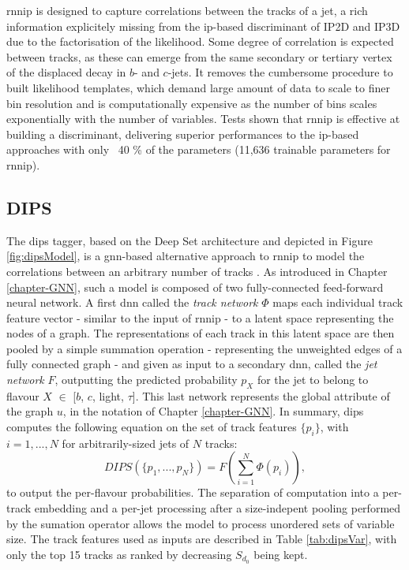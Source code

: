 \gls{rnnip} is designed to capture correlations between the tracks of a jet, a rich information explicitely missing from the \gls{ip}-based discriminant of IP2D and IP3D due to the factorisation of the likelihood. Some degree of correlation is expected between tracks, as these can emerge from the same secondary or tertiary vertex of the displaced decay in $b$- and $c$-jets. It removes the cumbersome procedure to built likelihood templates, which demand large amount of data to scale to finer bin resolution and is computationally expensive as the number of bins scales exponentially with the number of variables. Tests shown that \gls{rnnip} is effective at building a discriminant, delivering superior performances to the \gls{ip}-based approaches with only ~40 \% of the parameters (11,636 trainable parameters for \gls{rnnip})\cite{Paganini:2289214}.

\subsection{DIPS}
The \gls{dips} tagger, based on the Deep Set architecture \cite{NIPS2017f22e4747} and depicted in Figure \ref{fig:dipsModel}, is a \gls{gnn}-based alternative approach to \gls{rnnip} to model the correlations between an arbitrary number of tracks \cite{ATL-PHYS-PUB-2020-014}. As introduced in Chapter \ref{chapter-GNN}, such a model is composed of two fully-connected feed-forward neural network. A first \gls{dnn} called the \textit{track network} $\Phi$ maps each individual track feature vector - similar to the input of \gls{rnnip} - to a latent space representing the nodes of a graph. The representations of each track in this latent space are then pooled by a simple summation operation - representing the unweighted edges of a fully connected graph - and given as input to a secondary \gls{dnn}, called the \textit{jet network} $F$, outputting the predicted probability $p_X$ for the jet to belong to flavour $X$ $\in$ [$b$, $c$, light, $\tau$]. This last network represents the global attribute of the graph $u$, in the notation of Chapter \ref{chapter-GNN}. 
In summary, \gls{dips} computes the following equation on the set of track features $\{ p_i \}$, with $i = 1, ..., N$ for arbitrarily-sized jets of $N$ tracks:
\begin{equation}
  DIPS( \{p_1, ..., p_N \} ) = F\left( \sum_{i=1}^N \Phi(p_i) \right),
\end{equation}
to output the per-flavour probabilities. The separation of computation into a per-track embedding and a per-jet processing after a size-indepent pooling performed by the sumation operator allows the model to process unordered sets of variable size. The track features used as inputs are described in Table \ref{tab:dipsVar}, with only the top 15 tracks as ranked by decreasing $S_{d_0}$ being kept.

